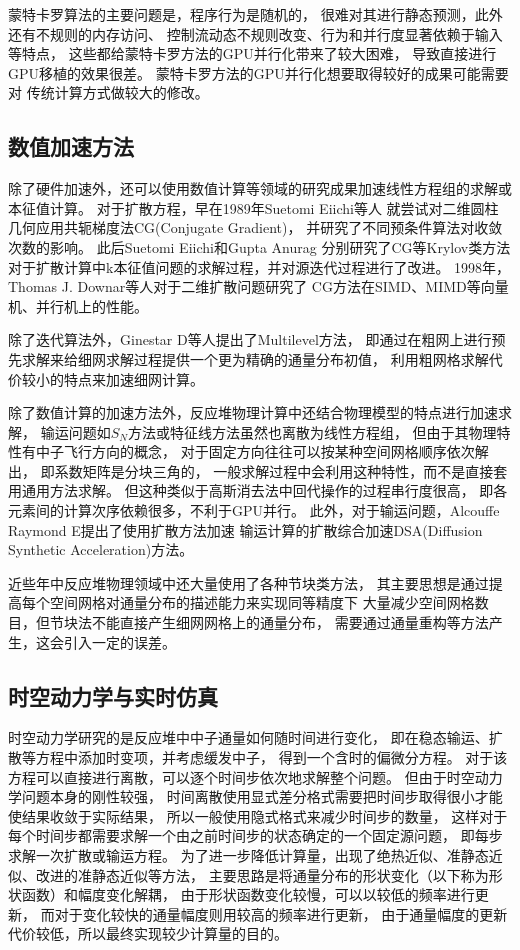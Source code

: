 蒙特卡罗算法的主要问题是，程序行为是随机的，
很难对其进行静态预测，此外还有不规则的内存访问、
控制流动态不规则改变、行为和并行度显著依赖于输入等特点，
这些都给蒙特卡罗方法的GPU并行化带来了较大困难，
导致直接进行GPU移植的效果很差。\cite{Martin2013}
蒙特卡罗方法的GPU并行化想要取得较好的成果可能需要对
传统计算方式做较大的修改。\cite{lichenglong}


\subsection{数值加速方法}

除了硬件加速外，还可以使用数值计算等领域的研究成果加速线性方程组的求解或本征值计算。
对于扩散方程，早在1989年Suetomi Eiichi等人\cite{suetomi1989conjugate}
就尝试对二维圆柱几何应用共轭梯度法CG(Conjugate Gradient)，
并研究了不同预条件算法对收敛次数的影响。
此后Suetomi Eiichi\cite{suetomi1991conjugate}和Gupta Anurag\cite{gupta_krylov_2004}
分别研究了CG等Krylov类方法对于扩散计算中k本征值问题的求解过程，并对源迭代过程进行了改进。
1998年，Thomas J. Downar等人\cite{so1998mapping}对于二维扩散问题研究了
CG方法在SIMD、MIMD等向量机、并行机上的性能。

除了迭代算法外，Ginestar D\cite{ginestar2001multilevel}等人提出了Multilevel方法，
即通过在粗网上进行预先求解来给细网求解过程提供一个更为精确的通量分布初值，
利用粗网格求解代价较小的特点来加速细网计算。

除了数值计算的加速方法外，反应堆物理计算中还结合物理模型的特点进行加速求解，
输运问题如$S_N$方法或特征线方法虽然也离散为线性方程组，
但由于其物理特性有中子飞行方向的概念，
对于固定方向往往可以按某种空间网格顺序依次解出，
即系数矩阵是分块三角的，
一般求解过程中会利用这种特性，而不是直接套用通用方法求解。
但这种类似于高斯消去法中回代操作的过程串行度很高，
即各元素间的计算次序依赖很多，不利于GPU并行。
此外，对于输运问题，Alcouffe Raymond E\cite{alcouffe1977diffusion}提出了使用扩散方法加速
输运计算的扩散综合加速DSA(Diffusion Synthetic Acceleration)方法。

近些年中反应堆物理领域中还大量使用了各种节块类方法，
其主要思想是通过提高每个空间网格对通量分布的描述能力来实现同等精度下
大量减少空间网格数目，但节块法不能直接产生细网网格上的通量分布，
需要通过通量重构等方法产生，这会引入一定的误差。

\subsection{时空动力学与实时仿真}

时空动力学研究的是反应堆中中子通量如何随时间进行变化，
即在稳态输运、扩散等方程中添加时变项，并考虑缓发中子，
得到一个含时的偏微分方程。
对于该方程可以直接进行离散，可以逐个时间步依次地求解整个问题。
但由于时空动力学问题本身的刚性较强，
时间离散使用显式差分格式需要把时间步取得很小才能使结果收敛于实际结果，
所以一般使用隐式格式来减少时间步的数量，
这样对于每个时间步都需要求解一个由之前时间步的状态确定的一个固定源问题，
即每步求解一次扩散或输运方程。
为了进一步降低计算量，出现了绝热近似、准静态近似、改进的准静态近似等方法，
主要思路是将通量分布的形状变化（以下称为形状函数）和幅度变化解耦，
由于形状函数变化较慢，可以以较低的频率进行更新，
而对于变化较快的通量幅度则用较高的频率进行更新，
由于通量幅度的更新代价较低，所以最终实现较少计算量的目的。
\cite{huangzuqia2007}

